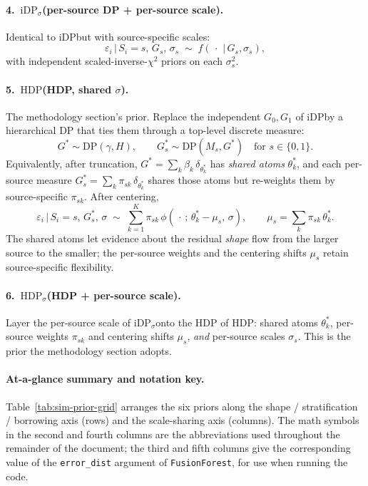 \documentclass[11pt]{article}
\theoremstyle{plain}
\theoremstyle{definition}
\theoremstyle{remark}
\newcommand{\1}{\mathds{1}}
\newcommand{\given}{\,|\,}
\newcommand{\miDP}{\ensuremath{\mathrm{iDP}}}
\newcommand{\miDPs}{\ensuremath{\mathrm{iDP}_\sigma}}
\newcommand{\mHDP}{\ensuremath{\mathrm{HDP}}}
\newcommand{\mHDPs}{\ensuremath{\mathrm{HDP}_\sigma}}
\begin{document}
\paragraph{4.\ \miDPs (per-source DP + per-source scale).}
Identical to \miDP but with source-specific scales:
\[
  \varepsilon_i \given S_i = s,\, G_s,\, \sigma_s \;\sim\;
   f(\,\cdot\, \given G_s, \sigma_s),
\]
with independent scaled-inverse-$\chi^2$ priors on each $\sigma_s^2$.

\paragraph{5.\ \mHDP (HDP, shared $\sigma$).}
The methodology section's prior. Replace the independent $G_0, G_1$
of \miDP by a hierarchical DP
\citep{teh2006hierarchical} that ties them through a top-level
discrete measure:
\[
  G^* \sim \mathrm{DP}(\gamma, H), \qquad
  G_s^* \sim \mathrm{DP}(M_s, G^*)
  \quad\text{for } s \in \{0, 1\}.
\]
Equivalently, after truncation,
$G^* = \sum_k \beta_k\, \delta_{\theta_k^*}$ has \emph{shared atoms}
$\theta_k^*$, and each per-source measure
$G_s^* = \sum_k \pi_{sk}\, \delta_{\theta_k^*}$ shares those atoms
but re-weights them by source-specific $\pi_{sk}$. After centering,
\[
  \varepsilon_i \given S_i = s,\, G_s^*,\, \sigma \;\sim\;
   \sum_{k=1}^K \pi_{sk}\,
   \phi(\,\cdot\,;\, \theta_k^* - \mu_s,\, \sigma),
\qquad
   \mu_s = \sum_k \pi_{sk}\, \theta_k^*.
\]
The shared atoms let evidence about the residual \emph{shape} flow
from the larger source to the smaller; the per-source weights and
the centering shifts $\mu_s$ retain source-specific flexibility.

\paragraph{6.\ \mHDPs (HDP + per-source scale).}
Layer the per-source scale of \miDPs onto the
HDP of \mHDP: shared atoms $\theta_k^*$, per-source
weights $\pi_{sk}$ and centering shifts $\mu_s$, \emph{and}
per-source scales $\sigma_s$. This is the prior the methodology
section adopts.

\paragraph{At-a-glance summary and notation key.}
Table~\ref{tab:sim-prior-grid} arranges the six priors along the
shape / stratification / borrowing axis (rows) and the
scale-sharing axis (columns). The math symbols in the second and
fourth columns are the abbreviations used throughout the remainder
of the document; the third and fifth columns give the corresponding
value of the \texttt{error\_dist} argument of
\texttt{FusionForest}, for use when running the code.
\end{document}
